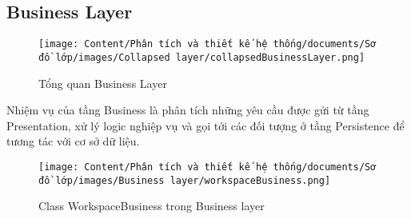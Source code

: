 \subsection{Business Layer}

\begin{figure}[H]
    \centering
    \texttt{[image: Content/Phân tích và thiết kế hệ thống/documents/Sơ đồ lớp/images/Collapsed layer/collapsedBusinessLayer.png]}
    \vspace{0.5cm}
    \caption{Tổng quan Business Layer}
    \label{fig:Tổng quan Business Layer}
\end{figure}

Nhiệm vụ của tầng Business là phân tích những yêu cầu được gửi từ tầng Presentation, xử lý logic nghiệp vụ và
gọi tới các đối tượng ở tầng Persistence để tương tác với cơ sở dữ liệu.

\begin{figure}[H]
    \centering
    \texttt{[image: Content/Phân tích và thiết kế hệ thống/documents/Sơ đồ lớp/images/Business layer/workspaceBusiness.png]}
    \vspace{0.5cm}
    \caption{Class WorkspaceBusiness trong Business layer}
    \label{fig:Class WorkspaceBusiness trong Business layer}
\end{figure}

